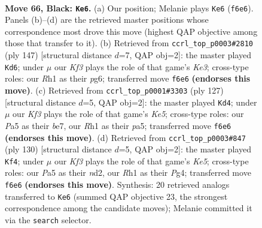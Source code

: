 \documentclass[11pt]{article}
\begin{document}
\clearpage

\begin{figure}[p]\centering
\begin{subfigure}{0.46\textwidth}\centering
\resizebox{\linewidth}{!}{%
\newchessgame
\chessboard[
  setfen={8/8/2p2k2/p2p4/5K2/8/8/7r b - - 3 66},
  showmover=false,
  pgfstyle=straightmove, color=movearrow, markmove={f6-e6}
]}
\caption{}
\end{subfigure}\hfill
\begin{subfigure}{0.46\textwidth}\centering
\resizebox{\linewidth}{!}{%
\newchessgame
\chessboard[
  setfen={8/6p1/4k1Pp/8/4K3/8/1P6/8 b - - 0 74},
  showmover=false,
  pgfstyle=straightmove, color=movearrow, markmove={e6-d6}
]}
\caption{}
\end{subfigure}
\\[4pt]
\begin{subfigure}{0.46\textwidth}\centering
\resizebox{\linewidth}{!}{%
\newchessgame
\chessboard[
  setfen={8/1p2B3/2p5/P7/4k1K1/8/8/8 b - - 6 64},
  showmover=false,
  pgfstyle=straightmove, color=movearrow, markmove={e4-d4}
]}
\caption{}
\end{subfigure}\hfill
\begin{subfigure}{0.46\textwidth}\centering
\resizebox{\linewidth}{!}{%
\newchessgame
\chessboard[
  setfen={8/5k2/8/4K1P1/6PP/8/3n4/8 w - - 5 66},
  showmover=false,
  pgfstyle=straightmove, color=movearrow, markmove={e5-f4}
]}
\caption{}
\end{subfigure}
\caption{\textbf{Move 66, Black: \texttt{Ke6}.} (a) Our position; Melanie plays \texttt{Ke6} (\texttt{f6e6}). Panels (b)--(d) are the retrieved master positions whose correspondence most drove this move (highest QAP objective among those that transfer to it). (b) Retrieved from \texttt{ccrl\_top\_p0003\#2810} (ply 147) [structural distance $d$=7, QAP obj=2]: the master played \texttt{Kd6}; under $\mu$ our \emph{Kf3} plays the role of that game's \emph{Ke3}; cross-type roles: our \emph{R}h1 as their \emph{p}g6; transferred move \texttt{f6e6} \textbf{(endorses this move)}. (c) Retrieved from \texttt{ccrl\_top\_p0001\#3303} (ply 127) [structural distance $d$=5, QAP obj=2]: the master played \texttt{Kd4}; under $\mu$ our \emph{Kf3} plays the role of that game's \emph{Ke5}; cross-type roles: our \emph{P}a5 as their \emph{b}e7, our \emph{R}h1 as their \emph{p}a5; transferred move \texttt{f6e6} \textbf{(endorses this move)}. (d) Retrieved from \texttt{ccrl\_top\_p0003\#847} (ply 130) [structural distance $d$=5, QAP obj=2]: the master played \texttt{Kf4}; under $\mu$ our \emph{Kf3} plays the role of that game's \emph{Ke5}; cross-type roles: our \emph{P}a5 as their \emph{n}d2, our \emph{R}h1 as their \emph{P}g4; transferred move \texttt{f6e6} \textbf{(endorses this move)}. Synthesis: 20 retrieved analogs transferred to \texttt{Ke6} (summed QAP objective 23, the strongest correspondence among the candidate moves); Melanie committed it via the \texttt{search} selector.}
\label{fig:thought-m131}
\end{figure}
\end{document}

